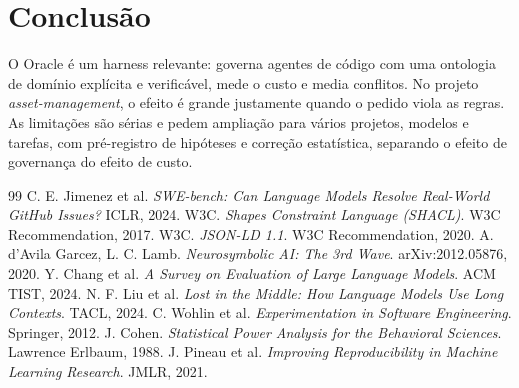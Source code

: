 \documentclass[11pt,a4paper]{article}
\begin{document}
\section{Conclusão}
O Oracle é um harness relevante: governa agentes de código com uma ontologia de domínio explícita e verificável, mede o custo e media conflitos. No projeto \emph{asset-management}, o efeito é grande justamente quando o pedido viola as regras. As limitações são sérias e pedem ampliação para vários projetos, modelos e tarefas, com pré-registro de hipóteses e correção estatística, separando o efeito de governança do efeito de custo.

\begin{thebibliography}{99}
 C. E. Jimenez et al. \emph{SWE-bench: Can Language Models Resolve Real-World GitHub Issues?} ICLR, 2024.
 W3C. \emph{Shapes Constraint Language (SHACL)}. W3C Recommendation, 2017.
 W3C. \emph{JSON-LD 1.1}. W3C Recommendation, 2020.
 A. d'Avila Garcez, L. C. Lamb. \emph{Neurosymbolic AI: The 3rd Wave}. arXiv:2012.05876, 2020.
 Y. Chang et al. \emph{A Survey on Evaluation of Large Language Models}. ACM TIST, 2024.
 N. F. Liu et al. \emph{Lost in the Middle: How Language Models Use Long Contexts}. TACL, 2024.
 C. Wohlin et al. \emph{Experimentation in Software Engineering}. Springer, 2012.
 J. Cohen. \emph{Statistical Power Analysis for the Behavioral Sciences}. Lawrence Erlbaum, 1988.
 J. Pineau et al. \emph{Improving Reproducibility in Machine Learning Research}. JMLR, 2021.
\end{thebibliography}
\end{document}

